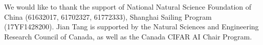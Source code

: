 \documentclass[sigconf]{acmart}
\begin{document}
\begin{acks}
We would like to thank the support of National Natural Science Foundation of China (61632017, 61702327, 61772333), Shanghai Sailing Program (17YF1428200). Jian Tang is supported by the Natural Sciences and Engineering Research Council of Canada, as well as the Canada CIFAR AI Chair Program.
\end{acks}



\end{document}

